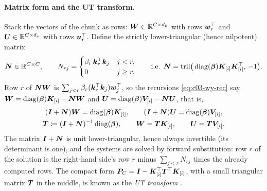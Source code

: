 \paragraph{Matrix form and the UT transform.}
Stack the vectors of the chunk as rows: $\bm{W}\in\mathbb{R}^{C\times d_k}$ with rows $\bm{w}_r^{\top}$ and
$\bm{U}\in\mathbb{R}^{C\times d_v}$ with rows $\bm{u}_r^{\top}$. Define the strictly lower-triangular (hence nilpotent) matrix
\begin{equation}\label{eq:c03-ut-A}
  \bm{N}\in\mathbb{R}^{C\times C},\qquad
  N_{rj}=\begin{cases}\beta_r\,\bm{k}_r^{\top}\bm{k}_j & j<r,\\ 0 & j\ge r,\end{cases}
  \qquad\text{i.e. } \bm{N}=\mathrm{tril}\big(\operatorname{diag}(\bm{\beta})\bm{K}_{[i]}\bm{K}_{[i]}^{\top},\,-1\big).
\end{equation}
Row $r$ of $\bm{N}\bm{W}$ is $\sum_{j<r}\beta_r(\bm{k}_r^{\top}\bm{k}_j)\bm{w}_j^{\top}$, so the recursions
\cref{eq:c03-wy-rec} say $\bm{W}=\operatorname{diag}(\bm{\beta})\bm{K}_{[i]}-\bm{N}\bm{W}$ and
$\bm{U}=\operatorname{diag}(\bm{\beta})\bm{V}_{[i]}-\bm{N}\bm{U}$, that is,
\begin{equation}\label{eq:c03-ut}
\begin{gathered}
  (\bm{I}+\bm{N})\bm{W}=\operatorname{diag}(\bm{\beta})\bm{K}_{[i]},\qquad (\bm{I}+\bm{N})\bm{U}=\operatorname{diag}(\bm{\beta})\bm{V}_{[i]},\\
  \bm{T}\coloneqq(\bm{I}+\bm{N})^{-1}\operatorname{diag}(\bm{\beta}),\qquad \bm{W}=\bm{T}\bm{K}_{[i]},\qquad \bm{U}=\bm{T}\bm{V}_{[i]} .
\end{gathered}
\end{equation}
The matrix $\bm{I}+\bm{N}$ is unit lower-triangular, hence always invertible (its determinant is one),
and the systems are solved by forward substitution: row $r$ of the solution is the right-hand
side's row $r$ minus $\sum_{j<r}N_{rj}$ times the already computed rows. The compact form
$\bm{P}_C=\bm{I}-\bm{K}_{[i]}^{\top}\bm{T}^{\top}\bm{K}_{[i]}$, with a small triangular matrix $\bm{T}$ in the middle, is
known as the \emph{UT transform} \citep{c03-joffrain2006accumulating}.

